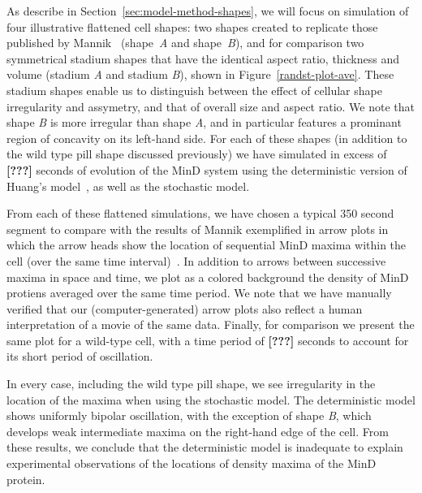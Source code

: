 \documentclass[letterpaper,twocolumn,amsmath,amssymb,pre]{revtex4-1}
\newcommand{\red}[1]{{\bf \color{red} #1}}
\newcommand{\fixme}[1]{\red{[#1]}}
\begin{document}
As describe in Section~\ref{sec:model-method-shapes}, we will focus on
simulation of four illustrative flattened cell shapes: two shapes
created to replicate those published by
Mannik~\cite{mannik2012robustness} (shape~\emph{A} and
shape~\emph{B}), and for comparison two symmetrical stadium shapes
that have the identical aspect ratio, thickness and volume (stadium
\emph{A} and stadium \emph{B}), shown in Figure~\ref{randst-plot-ave}.
These stadium shapes enable us to distinguish between the effect of
cellular shape irregularity and assymetry, and that of overall size
and aspect ratio.  We note that shape \emph{B} is more irregular than
shape \emph{A}, and in particular features a prominant region of
concavity on its left-hand side.  For each of these shapes (in
addition to the wild type pill shape discussed previously) we have
simulated in excess of \fixme{???}  seconds of evolution of the MinD
system using the deterministic version of Huang's
model~\cite{huang2003dynamic}, as well as the stochastic model.

From each of these flattened simulations, we have chosen a typical 350
second segment to compare with the results of Mannik exemplified in
arrow plots in which the arrow heads show the location of sequential
MinD maxima within the cell (over the same time
interval)~\cite{mannik2012robustness}.  In addition to arrows between
successive maxima in space and time, we plot as a colored background
the density of MinD protiens averaged over the same time period.  We
note that we have manually verified that our (computer-generated)
arrow plots also reflect a human interpretation of a movie of the same
data.  Finally, for comparison we present the same plot for a
wild-type cell, with a time period of \fixme{???}  seconds to account
for its short period of oscillation.

In every case, including the wild type pill shape, we see irregularity
in the location of the maxima when using the stochastic model.  The
deterministic model shows uniformly bipolar oscillation, with the
exception of shape \emph{B}, which develops weak intermediate maxima
on the right-hand edge of the cell.  From these results, we conclude
that the deterministic model is inadequate to explain experimental
observations of the locations of density maxima of the MinD protein.


\end{document}
